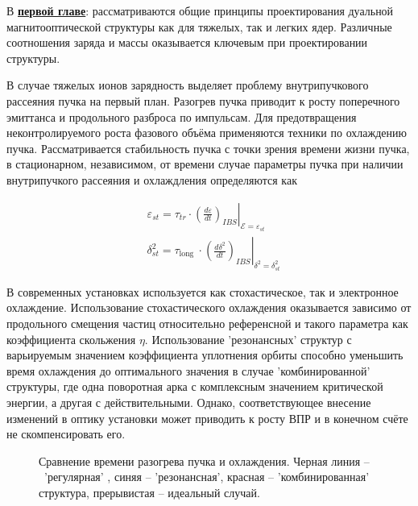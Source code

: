 В \underline{\textbf{первой главе}}: рассматриваются общие принципы проектирования дуальной магнитооптической структуры как для тяжелых, так и легких ядер. Различные соотношения заряда и массы оказывается ключевым при проектировании структуры. 
\par В случае тяжелых ионов зарядность выделяет проблему внутрипучкового рассеяния пучка на первый план. Разогрев пучка приводит к росту поперечного эмиттанса и продольного разброса по импульсам. Для предотвращения неконтролируемого роста фазового объёма применяются техники по охлаждению пучка. Рассматривается стабильность пучка с точки зрения времени жизни пучка, в стационарном, независимом, от времени случае параметры пучка при наличии внутрипучкого рассеяния и охлаждления определяются как

\[
    \begin{aligned}
& \varepsilon_{s t}=\left.\tau_{t r} \cdot\left(\frac{d \varepsilon}{d t}\right)_{I B S}\right|_{\mathcal{E}=\varepsilon_{s t}} \\
& \delta_{s t}^2=\left.\tau_{\text {long }} \cdot\left(\frac{d \delta^2}{d t}\right)_{I B S}\right|_{\delta^2=\delta_{s t}^2}
\end{aligned}
\]

\noindent В современных установках используется как стохастическое, так и электронное охлаждение. Использование стохастического охлаждения оказывается зависимо от продольного смещения частиц относительно референсной и такого параметра как коэффициента скольжения $\eta$. Использование 'резонансных' структур с варьируемым значением коэффициента уплотнения орбиты способно уменьшить время охлаждения до оптимального значения в случае 'комбинированной' структуры, где одна поворотная арка с комплексным значением критической энергии, а другая с действительными. Однако, соответствующее внесение изменений в оптику установки может приводить к росту ВПР и в конечном счёте не скомпенсировать его.

\begin{figure}[ht]
    \caption{Сравнение времени разогрева пучка и охлаждения. Черная линия – 'регулярная' , синяя – 'резонансная', красная – 'комбинированная' структура, прерывистая – идеальный случай.}\label{fig:latex}
\end{figure}

